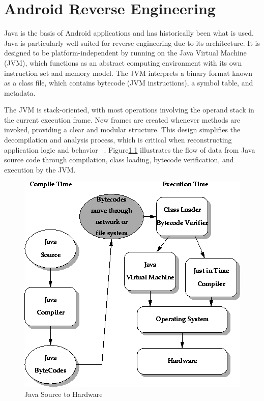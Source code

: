 \chapter{Android Reverse Engineering}
Java is the basis of Android applications and has historically been what is used. Java is particularly well-suited for reverse engineering due to its architecture. It is designed to be platform-independent by running on the Java Virtual Machine (JVM), which functions as an abstract computing environment with its own instruction set and memory model. The JVM interprets a binary format known as a class file, which contains bytecode (JVM instructions), a symbol table, and metadata.

The JVM is stack-oriented, with most operations involving the operand stack in the current execution frame. New frames are created whenever methods are invoked, providing a clear and modular structure. This design simplifies the decompilation and analysis process, which is critical when reconstructing application logic and behavior ~\cite{jvms8}.
Figure\ref{fig:javaprocess} illustrates the flow of data from Java source code through compilation, class loading, bytecode verification, and execution by the JVM.
\begin{figure}
	\centering
	\includegraphics[scale=.7]{java_process.png}
	\caption{Java Source to Hardware}
	\label{fig:javaprocess}
\end{figure}

